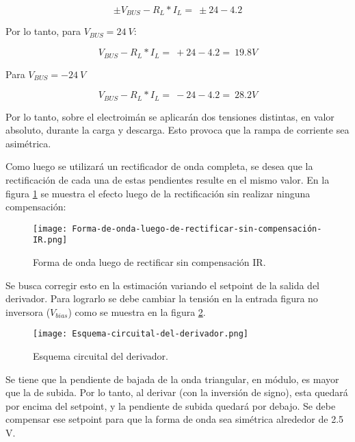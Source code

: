 \begin{equation} \label{eq_Vbus-didt-RL-2}
\pm V_{BUS}-R_L*I_L=\ \pm 24-4.2
\end{equation}

\noindent Por lo tanto, para $V_{BUS}=24\ V$:

\begin{equation} \label{eq_Vbus-didt-RL-3}
	V_{BUS}-R_L*I_L=\ +24-4.2=\ 19.8V
\end{equation}

\noindent Para $V_{BUS}=-24\ V$

\begin{equation} \label{eq_Vbus-didt-RL-4}
	V_{BUS}-R_L*I_L=\ -24-4.2=\ 28.2V
\end{equation}

\noindent Por lo tanto, sobre el electroim\'{a}n se aplicar\'{a}n dos tensiones distintas, en valor absoluto, durante la carga y descarga. Esto provoca que la rampa de corriente sea asim\'{e}trica.

\noindent Como luego se utilizar\'{a} un rectificador de onda completa, se desea que la rectificaci\'{o}n de cada una de estas pendientes resulte en el mismo valor. En la figura \ref{fig:img_Forma-de-onda-luego-de-rectificar-sin-compensación-IR} se muestra el efecto luego de la rectificaci\'{o}n sin realizar ninguna compensaci\'{o}n:

\begin{figure}[H]
	\centering
	\texttt{[image: Forma-de-onda-luego-de-rectificar-sin-compensación-IR.png]}
	\caption{Forma de onda luego de rectificar sin compensación IR.}
	\label{fig:img_Forma-de-onda-luego-de-rectificar-sin-compensación-IR}
\end{figure}

\noindent Se busca corregir esto en la estimaci\'{o}n variando el setpoint de la salida del derivador. Para lograrlo se debe cambiar la tensi\'{o}n en la entrada figura no inversora ($V_{bias}$) como se muestra en la figura \ref{fig:img_Esquema-circuital-del-derivador}. 

\begin{figure}[H]
	\centering
	\texttt{[image: Esquema-circuital-del-derivador.png]}
	\caption{Esquema circuital del derivador.}
	\label{fig:img_Esquema-circuital-del-derivador}
\end{figure}

\noindent Se tiene que la pendiente de bajada de la onda triangular, en m\'{o}dulo, es mayor que la de subida. Por lo tanto, al derivar (con la inversi\'{o}n de signo), esta quedar\'{a} por encima del setpoint, y la pendiente de subida quedar\'{a} por debajo. Se debe compensar ese setpoint para que la forma de onda sea sim\'{e}trica alrededor de 2.5 V. 

